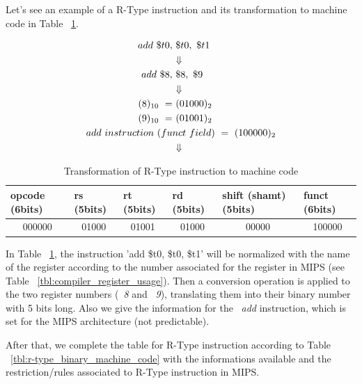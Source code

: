 \documentclass[
  oneside,
  11pt, a4paper,
  footinclude=true,
  headinclude=true,
  cleardoublepage=empty
]{scrbook}
\begin{document}
Let's see an example of a R-Type instruction and its transformation to machine code in Table ~\ref{tbl:r-type_transformation2machine_code}.


\newpage

\begin{align*}
  add\ \$t0,&\ \$t0,\ \$t1\\
  &\makebox[\widthof{${}={}$}]{$\Downarrow$} \\
  add\ \$8,&\ \$8,\ \$9\\
  &\makebox[\widthof{${}={}$}]{$\Downarrow$} \\
  (8)_{10}\ =&\ (01000)_{2}\\
  (9)_{10}\ =&\ (01001)_{2}\\
  add\ instruction\ (fu&nct\ field)\ =\ (100000)_{2}\\
  &\makebox[\widthof{${}={}$}]{$\Downarrow$}
\end{align*}

\vspace{-7mm}
\begin{table}[h!]
\centering
\begin{tabular}{|l|l|l|l|l|l|}
\hline
\textbf{opcode (6bits)}      & \textbf{rs (5bits)}        & \textbf{rt (5bits)}        & \textbf{rd (5bits)}        & \textbf{shift (shamt) (5bits)} & \textbf{funct (6bits)}     \\ \hline
\multicolumn{1}{|c|}{000000} & \multicolumn{1}{c|}{01000} & \multicolumn{1}{c|}{01001} & \multicolumn{1}{c|}{01000} & \multicolumn{1}{c|}{00000}     & \multicolumn{1}{c|}{100000} \\ \hline
\end{tabular}
\caption{Transformation of R-Type instruction to machine code}
\label{tbl:r-type_transformation2machine_code}
\end{table}

In Table ~\ref{tbl:r-type_transformation2machine_code}, the instruction 'add \$t0, \$t0, \$t1' will be normalized with the name of the register according to the number associated for the register in MIPS (see Table ~\ref{tbl:compiler_register_usage}). Then a conversion operation is applied to the two register numbers (~\textit{8} and ~\textit{9}), translating them into their binary number with 5 bits long. Also we give the information for the ~\textit{add} instruction, which is set for the MIPS architecture (not predictable).


After that, we complete the table for R-Type instruction according to Table ~\ref{tbl:r-type_binary_machine_code} with the informations available and the restriction/rules associated to R-Type instruction in MIPS.
\end{document}
